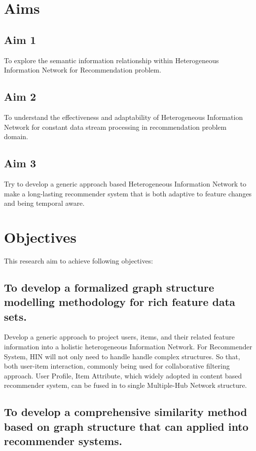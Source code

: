 \newpage

\section{Aims}
\subsection{Aim 1}
To explore the semantic information relationship within Heterogeneous Information Network for Recommendation problem.

\subsection{Aim 2}
To understand the effectiveness and adaptability of Heterogeneous Information Network for constant data stream processing in recommendation problem domain. 

\subsection{Aim 3}
Try to develop a generic approach based Heterogeneous Information Network to make a long-lasting recommender system that is both adaptive to feature changes and being temporal aware. 

\section{Objectives}
This research aim to achieve following objectives: 

\subsection{To develop a formalized graph structure modelling methodology for rich feature data sets.  }

Develop a generic approach to project users, items, and their related feature information into a holistic heterogeneous Information Network. For Recommender System, HIN will not only need to handle handle complex structures. So that, both user-item interaction, commonly being used for collaborative filtering approach. User Profile, Item Attribute, which widely adopted in content based recommender system, can be fused in to single Multiple-Hub Network \citep{Shi2017} structure.

\subsection{To develop a comprehensive similarity method based on graph structure that can applied into recommender systems. } 

